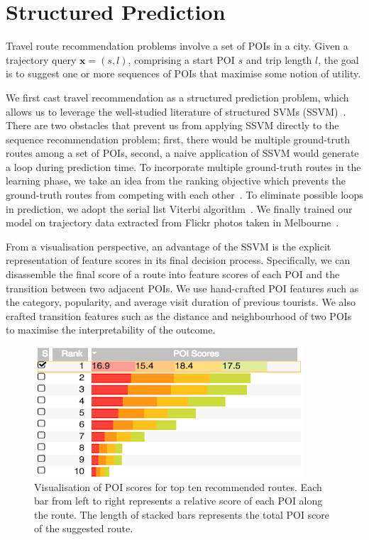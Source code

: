 \section{Structured Prediction}
Travel route recommendation problems involve a set of POIs in a city. 
Given a trajectory query $\mathbf{x} = (s, l)$, comprising a start POI $s$ and trip length $l$, the goal is to suggest one or more sequences of POIs that maximise some notion of utility.

We first cast travel recommendation as a structured prediction problem, which allows us to leverage the well-studied literature of structured SVMs (SSVM)~\cite{tsochantaridis2005large,joachims2009predicting}. 
There are two obstacles that prevent us from applying SSVM directly to the sequence recommendation problem; first, there would be multiple ground-truth routes among a set of POIs, second, a naive application of SSVM would generate a loop during prediction time. 
To incorporate multiple ground-truth routes in the learning phase, we take an idea from the ranking objective which prevents the ground-truth routes from competing with each other~\cite{rendle2009bpr}. 
To eliminate possible loops in prediction, we adopt the serial list Viterbi algorithm~\cite{seshadri1994list,nill1995list,nilsson2001sequentially}.
We finally trained our model on trajectory data extracted from Flickr photos taken in Melbourne~\cite{chen2016learning}.

From a visualisation perspective, an advantage of the SSVM is the explicit representation of feature scores in its final decision process. Specifically, we can disassemble the final score of a route into feature scores of each POI and the transition between two adjacent POIs. 
We use hand-crafted POI features such as the category, popularity, and average visit duration of previous tourists. We also crafted transition features such as the distance and neighbourhood of two POIs to maximise the interpretability of the outcome.

\begin{figure}[t!]
\includegraphics[width=0.7\linewidth]{figure/sample_stack.png}
\caption{Visualisation of POI scores for top ten recommended routes. Each bar from left to right represents a relative score of each POI along the route.
The length of stacked bars represents the total POI score of the suggested route.}
\label{fig:stack} \vspace{-2em}
\end{figure}
